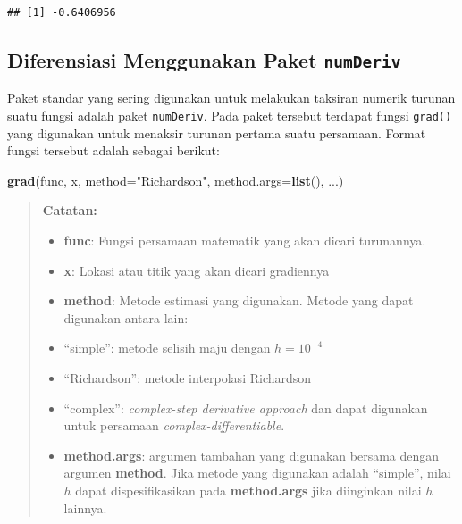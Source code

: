 \documentclass[]{book}
\newenvironment{Shaded}{\begin{snugshade}}{\end{snugshade}}
\newcommand{\DataTypeTok}[1]{\textcolor[rgb]{0.13,0.29,0.53}{#1}}
\newcommand{\KeywordTok}[1]{\textcolor[rgb]{0.13,0.29,0.53}{\textbf{#1}}}
\newcommand{\NormalTok}[1]{#1}
\newcommand{\StringTok}[1]{\textcolor[rgb]{0.31,0.60,0.02}{#1}}
\providecommand{\tightlist}{%
  \setlength{\itemsep}{0pt}\setlength{\parskip}{0pt}}
\theoremstyle{definition}
\theoremstyle{definition}
\theoremstyle{definition}
\theoremstyle{remark}
\begin{document}
\begin{verbatim}
## [1] -0.6406956
\end{verbatim}

\hypertarget{diferensiasi-menggunakan-paket-numderiv}{%
\subsection{\texorpdfstring{Diferensiasi Menggunakan Paket \texttt{numDeriv}}{Diferensiasi Menggunakan Paket numDeriv}}\label{diferensiasi-menggunakan-paket-numderiv}}

Paket standar yang sering digunakan untuk melakukan taksiran numerik turunan suatu fungsi adalah paket \texttt{numDeriv}. Pada paket tersebut terdapat fungsi \texttt{grad()} yang digunakan untuk menaksir turunan pertama suatu persamaan. Format fungsi tersebut adalah sebagai berikut:

\begin{Shaded}
\begin{Highlighting}[]
\KeywordTok{grad}\NormalTok{(func, x, }\DataTypeTok{method=}\StringTok{"Richardson"}\NormalTok{, }\DataTypeTok{method.args=}\KeywordTok{list}\NormalTok{(), ...)}
\end{Highlighting}
\end{Shaded}

\begin{quote}
\textbf{Catatan:}

\begin{itemize}
\tightlist
\item
  \textbf{func}: Fungsi persamaan matematik yang akan dicari turunannya.
\item
  \textbf{x}: Lokasi atau titik yang akan dicari gradiennya
\item
  \textbf{method}: Metode estimasi yang digunakan. Metode yang dapat digunakan antara lain:
\item
  ``simple'': metode selisih maju dengan \(h = 10^{-4}\)
\item
  ``Richardson'': metode interpolasi Richardson
\item
  ``complex'': \emph{complex-step derivative approach} dan dapat digunakan untuk persamaan \emph{complex-differentiable}.
\item
  \textbf{method.args}: argumen tambahan yang digunakan bersama dengan argumen \textbf{method}. Jika metode yang digunakan adalah ``simple'', nilai \(h\) dapat dispesifikasikan pada \textbf{method.args} jika diinginkan nilai \(h\) lainnya.
\end{itemize}
\end{quote}
\end{document}

